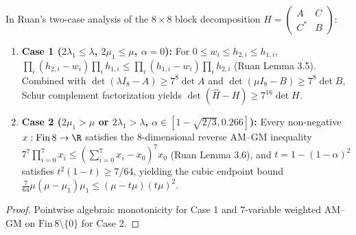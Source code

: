 \begin{theorem}
\label{thm_ruan_cases_1_and_2}
\leanok
{}
In Ruan's two-case analysis of the $8 \times 8$ block decomposition $H = \begin{pmatrix} A & C \\ C^* & B \end{pmatrix}$:
\begin{enumerate}
\item \textbf{Case 1 ($2\lambda_1 \le \lambda$, $2\mu_1 \le \mu$, $\alpha = 0$):} For $0 \le w_i \le h_{2,i} \le h_{1,i}$, $\prod_i (h_{2,i} - w_i)\prod_i h_{1,i} \le \prod_i (h_{1,i} - w_i)\prod_i h_{2,i}$ (Ruan Lemma 3.5). Combined with $\det(\lambda I_8 - A) \ge 7^8 \det A$ and $\det(\mu I_8 - B) \ge 7^8 \det B$, Schur complement factorization yields $\det(\widehat{H} - H) \ge 7^{16} \det H$.
\item \textbf{Case 2 ($2\mu_1 > \mu$ or $2\lambda_1 > \lambda$, $\alpha \in [1 - \sqrt{2/3}, 0.266]$):} Every non-negative $x : \mathrm{Fin}\,8 \to \R$ satisfies the $8$-dimensional reverse AM--GM inequality $7^7 \prod_{i=0}^7 x_i \le (\sum_{i=0}^7 x_i - x_0)^7 x_0$ (Ruan Lemma 3.6), and $t = 1 - (1 - \alpha)^2$ satisfies $t^2(1 - t) \ge 7/64$, yielding the cubic endpoint bound $\frac{7}{64}\mu(\mu - \mu_1)\mu_1 \le (\mu - t\mu)(t\mu)^2$.
\end{enumerate}
\end{theorem}
\begin{proof}\leanok Pointwise algebraic monotonicity for Case 1 and $7$-variable weighted AM--GM on $\mathrm{Fin}\,8 \setminus \{0\}$ for Case 2.\end{proof}

